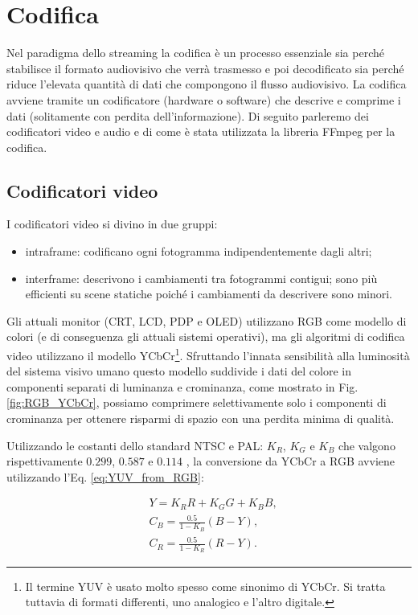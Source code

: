 \section{Codifica} \label{sec:cap3_Codifica}
Nel paradigma dello streaming la codifica è un processo essenziale sia perché stabilisce il formato audiovisivo che verrà trasmesso e poi decodificato sia perché riduce l'elevata quantità di dati che compongono il flusso audiovisivo. La codifica avviene tramite un codificatore (hardware o software) che descrive e comprime i dati (solitamente con perdita dell'informazione). Di seguito parleremo dei codificatori video e audio e di come è stata utilizzata la libreria FFmpeg per la codifica.

\subsection{Codificatori video}
I codificatori video si divino in due gruppi:

\begin{itemize}
	\item intraframe: codificano ogni fotogramma indipendentemente dagli altri;
	\item interframe: descrivono i cambiamenti tra fotogrammi contigui; sono più efficienti su scene statiche poiché i cambiamenti da descrivere sono minori.
\end{itemize}

Gli attuali monitor (CRT, LCD, PDP e OLED) utilizzano RGB come modello di colori (e di conseguenza gli attuali sistemi operativi), ma gli algoritmi di codifica video utilizzano il modello YCbCr\footnote{Il termine YUV è usato molto spesso come sinonimo di YCbCr. Si tratta tuttavia di formati differenti, uno analogico e l'altro digitale.}. Sfruttando l'innata sensibilità alla luminosità del sistema visivo umano questo modello suddivide i dati del colore in componenti separati di luminanza e crominanza, come mostrato in Fig. \ref{fig:RGB_YCbCr}, possiamo comprimere selettivamente solo i componenti di crominanza per ottenere risparmi di spazio con una perdita minima di qualità.

Utilizzando le costanti dello standard NTSC e PAL: $K_R$, $K_G$ e $K_B$ che valgono rispettivamente $0.299$, $0.587$ e $0.114$ \parencite{VideoAndMultimediaTransmissionsOverCellularNetworks}, la conversione da YCbCr a RGB avviene utilizzando l'Eq. \ref{eq:YUV_from_RGB}:

\begin{equation} \label{eq:YUV_from_RGB}
	\begin{aligned}
		& Y = K_R R + K_G G + K_B B, \\	
		& C_B = \frac{0.5}{1 - K_B} (B - Y), \\
		& C_R = \frac{0.5}{1 - K_R} (R - Y).	
	\end{aligned}
\end{equation}

